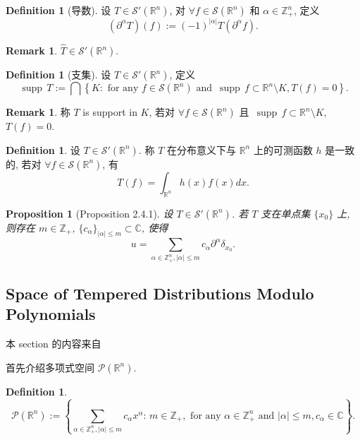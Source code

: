 \documentclass[a4paper,11pt]{article}
\newtheorem{proposition}[theorem]{Proposition}
\theoremstyle{definition}
\newtheorem{remark}[theorem]{Remark}
\newtheorem{definition}[theorem]{Definition}
\def \supp {\mathop\mathrm{\,supp\,}}
\begin{document}
\begin{CJK*}{UTF8}{gbsn}
\begin{definition}[导数]
    设 $ T \in \mathcal{S}'(\mathbb{R}^n) $, 对 $ \forall f \in \mathcal{S}(\mathbb{R}^n) $ 和 $ \alpha \in \mathbb{Z}_+^n $, 定义
    $$
        (\partial^\alpha T) (f) := (-1)^{|\alpha|} T (\partial^\alpha f).
    $$
\end{definition}

\begin{remark}
     $ \widehat{T} \in \mathcal{S}'(\mathbb{R}^n) $.
\end{remark}

\begin{definition}[支集]
    设 $ T \in \mathcal{S}'(\mathbb{R}^n) $, 定义 
    $$ 
        \supp T := \bigcap \left\{ K: \text{ for any } f \in \mathcal{S}(\mathbb{R}^n) \text{ and } \supp f \subset \mathbb{R}^n \setminus K, 
            T(f) = 0 \right\}.
    $$
\end{definition}

\begin{remark}
     称 $ T $ is support in $ K $, 
     若对 $ \forall f \in \mathcal{S}(\mathbb{R}^n) $ 且 $ \supp f \subset \mathbb{R}^n \setminus K $, $ T(f) = 0 $.
\end{remark}

\begin{definition}
    设 $ T \in \mathcal{S}'(\mathbb{R}^n) $. 称 $ T $ 在分布意义下与 $ \mathbb{R}^n $ 上的可测函数 $ h $ 是一致的, 
    若对 $ \forall f \in \mathcal{S}(\mathbb{R}^n) $, 有
    $$
        T(f) = \int_{\mathbb{R}^n} h(x) f(x) dx.
    $$
\end{definition}

\begin{proposition}[Proposition 2.4.1]
    设 $ T \in \mathcal{S}'(\mathbb{R}^n) $. 若 $ T $ 支在单点集 $ \{x_0\} $ 上, 则存在
    $ m \in \mathbb{Z}_+ $, $ \{c_\alpha\}_{|\alpha| \leq m} \subset \mathbb{C} $, 使得
    $$
        u = \sum_{\alpha \in \mathbb{Z}_+^n, |\alpha| \leq m} c_\alpha \partial^\alpha \delta_{x_0}.
    $$
\end{proposition}

\subsection{Space of Tempered Distributions Modulo Polynomials}

本 section 的内容来自 \cite[1.1.1]{g14}

首先介绍多项式空间 $ \mathcal{P}(\mathbb{R}^n) $.
\begin{definition}
    $$
        \mathcal{P}(\mathbb{R}^n) 
            := \left\{ \sum_{\alpha \in \mathbb{Z}_+^n, |\alpha| \leq m} c_\alpha x^{\alpha} :\,
                 m \in \mathbb{Z}_+, \text{ for any } \alpha \in \mathbb{Z}_+^n \text{ and } |\alpha| \leq m, c_\alpha \in \mathbb{C} \right\}.
    $$
\end{definition} 



\end{CJK*}
\end{document}
